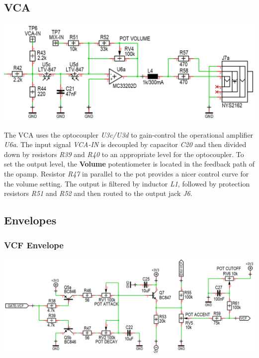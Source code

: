 \documentclass{scrartcl}
\begin{document}
\subsection{VCA}

\begin{center}
    \includegraphics[scale=0.40]{assets/schema-vca.png}
\end{center}

The VCA uses the optocoupler \emph{U3c/U3d} to gain-control the operational amplifier \emph{U6a}. The input signal \emph{VCA-IN} is decoupled by capacitor \emph{C20} and then divided down by resistors \emph{R39} and \emph{R40} to an appropriate level for the optocoupler. To set the output level, the \textbf{Volume} potentiometer is located in the feedback path of the opamp. Resistor \emph{R47} in parallel to the pot provides a nicer control curve for the volume setting. The output is filtered by inductor \emph{L1}, followed by protection resistors \emph{R51} and \emph{R52} and then routed to the output jack \emph{J6}.

\subsection{Envelopes}

\subsubsection{VCF Envelope}

\begin{center}
    \includegraphics[scale=0.35]{assets/schema-ar-vcf.png}
\end{center}
\end{document}

